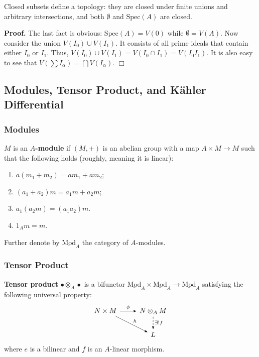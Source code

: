 \documentclass{template}
\newcommand{\qedwhite}{\hfill \ensuremath{\Box}}
\begin{document}
\begin{lemma}
    Closed subsets define a topology: they are closed under finite unions and
    arbitrary intersections, and both $\emptyset$ and $\text{Spec}(A)$ are
    closed.
\end{lemma}

\textbf{Proof.} The last fact is obvious: $\text{Spec}(A) = V(0)$ while
$\emptyset = V(A)$. Now consider the union $V(I_0) \cup V(I_1)$. It consists of
all prime ideals that contain either $I_0$ or $I_1$. Thus, $V(I_0) \cup V(I_1) =
V(I_0 \cap I_1) = V(I_0I_1)$. It is also easy to see that $V(\sum I_{\alpha}) =
\bigcap V(I_{\alpha})$. \qedwhite

\subsection{Modules, Tensor Product, and Kähler Differential}

\subsubsection{Modules}

\begin{definition}
    $M$ is an \textbf{$A$-module} if $(M,+)$ is an abelian group with a map $A
    \times M \to M$ such that the following holds (roughly, meaning it is
    linear):
    \begin{enumerate}
        \item[(i)] $a(m_1+m_2) = am_1 + am_2$;
        \item[(ii)] $(a_1+a_2)m = a_1m + a_2m$;
        \item[(iii)] $a_1(a_2m) = (a_1a_2)m$.  
        \item[(iv)] $1_Am = m$. 
    \end{enumerate}

    Further denote by $\underline{\text{Mod}}_A$ the category of $A$-modules.
\end{definition}

\subsubsection{Tensor Product}

\begin{definition}
    \textbf{Tensor product} $\bullet \otimes_A \bullet$ is a bifunctor
    $\underline{\text{Mod}}_A \times \underline{\text{Mod}}_A \to
    \underline{\text{Mod}}_A$ satisfying the following universal property:
    \[
    \begin{tikzcd}
        N \times M \arrow[-Stealth]{r}{\phi} 
        \arrow[-Stealth]{rd}{h} & N \otimes_A M \arrow[-Stealth, dashed]{d}{\exists! f}  \\
        & L
    \end{tikzcd}
    \]
    where $e$ is a bilinear and $f$ is an $A$-linear morphism.
\end{definition}
\end{document}
